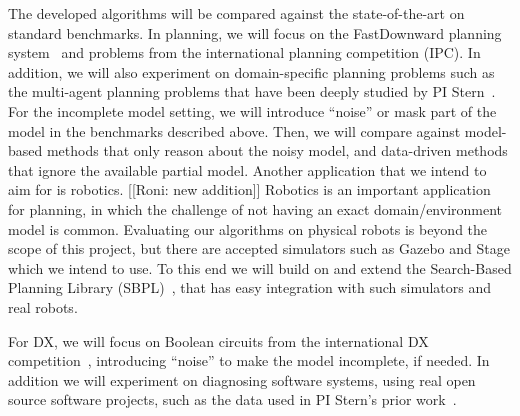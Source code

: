 \documentclass[12pt]{article}
\begin{document}
The developed algorithms will be compared against the state-of-the-art on standard benchmarks. In planning, 
we will focus on the FastDownward planning system~\cite{helmert2006fast} and problems from the international planning competition (IPC). 
In addition, we will also experiment on domain-specific planning problems such as the multi-agent planning problems that have been deeply studied by PI Stern~\cite{sharon2013increasing,sharon2015conflict,boyarski2015icbs,boyrasky2015dont,maliah2016collaborative}. 
For the incomplete model setting, we will introduce ``noise'' or mask part of the model in the benchmarks described above. Then, we will compare against model-based methods that only reason about the noisy model, and data-driven methods that ignore the available partial model. 
Another application that we intend to aim for is robotics. 
[[Roni: new addition]]
Robotics is an important application for planning, in which the challenge of not having an exact domain/environment model is common. Evaluating our algorithms on physical robots is beyond the scope of this project, but there are accepted simulators such as Gazebo and Stage which we intend to use. To this end we will build on and extend the Search-Based Planning Library (SBPL)~\cite{likhachev2014sbpl}, that has easy integration with such simulators and real robots. 

For DX, we will focus on Boolean circuits from the international DX competition~\cite{poll2011third}, introducing ``noise'' to make the model incomplete, if needed. In addition we will experiment on diagnosing software systems, using real open source software projects, such as the data used in PI Stern's prior work~\cite{Zamir2014UsingMD,elmishali2016dataAugmented,barIlan2017learningSoftwareBehavior}. 

\end{document}
